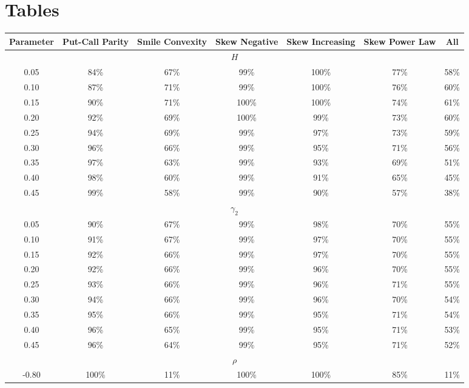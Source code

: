 \section{Tables} \label{sec:Tables}

\begin{table}[h!]
    \centering
    \small
    \setlength{\tabcolsep}{4pt}
    \begin{tabular}{c|cccccc}
    \toprule
    Parameter & Put-Call Parity & Smile Convexity & Skew Negative & Skew Increasing & Skew Power Law & All \\
    \midrule
    \multicolumn{7}{c}{$H$} \\
    0.05 & 84\% & 67\% & 99\% & 100\% & 77\% & 58\% \\
    0.10 & 87\% & 71\% & 99\% & 100\% & 76\% & 60\% \\
    0.15 & 90\% & 71\% & 100\% & 100\% & 74\% & 61\% \\
    0.20 & 92\% & 69\% & 100\% & 99\% & 73\% & 60\% \\
    0.25 & 94\% & 69\% & 99\% & 97\% & 73\% & 59\% \\
    0.30 & 96\% & 66\% & 99\% & 95\% & 71\% & 56\% \\
    0.35 & 97\% & 63\% & 99\% & 93\% & 69\% & 51\% \\
    0.40 & 98\% & 60\% & 99\% & 91\% & 65\% & 45\% \\
    0.45 & 99\% & 58\% & 99\% & 90\% & 57\% & 38\% \\
    \midrule
    \multicolumn{7}{c}{$\gamma_2$} \\
    0.05 & 90\% & 67\% & 99\% & 98\% & 70\% & 55\% \\
    0.10 & 91\% & 67\% & 99\% & 97\% & 70\% & 55\% \\
    0.15 & 92\% & 66\% & 99\% & 97\% & 70\% & 55\% \\
    0.20 & 92\% & 66\% & 99\% & 96\% & 70\% & 55\% \\
    0.25 & 93\% & 66\% & 99\% & 96\% & 71\% & 55\% \\
    0.30 & 94\% & 66\% & 99\% & 96\% & 70\% & 54\% \\
    0.35 & 95\% & 66\% & 99\% & 95\% & 71\% & 54\% \\
    0.40 & 96\% & 65\% & 99\% & 95\% & 71\% & 53\% \\
    0.45 & 96\% & 64\% & 99\% & 95\% & 71\% & 52\% \\
    \midrule
    \multicolumn{7}{c}{$\rho$} \\
    -0.80 & 100\% & 11\% & 100\% & 100\% & 85\% & 11\% \\

\end{tabular}
\end{table}
